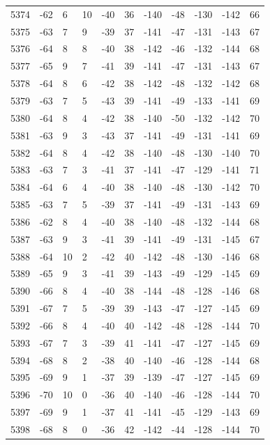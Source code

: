 \begin{table}[H]
\begin{tabular}{lllllllllll}
5374 & -62 & 6 & 10 & -40 & 36 & -140 & -48 & -130 & -142 & 66 \\
5375 & -63 & 7 & 9 & -39 & 37 & -141 & -47 & -131 & -143 & 67 \\
5376 & -64 & 8 & 8 & -40 & 38 & -142 & -46 & -132 & -144 & 68 \\
5377 & -65 & 9 & 7 & -41 & 39 & -141 & -47 & -131 & -143 & 67 \\
5378 & -64 & 8 & 6 & -42 & 38 & -142 & -48 & -132 & -142 & 68 \\
5379 & -63 & 7 & 5 & -43 & 39 & -141 & -49 & -133 & -141 & 69 \\
5380 & -64 & 8 & 4 & -42 & 38 & -140 & -50 & -132 & -142 & 70 \\
5381 & -63 & 9 & 3 & -43 & 37 & -141 & -49 & -131 & -141 & 69 \\
5382 & -64 & 8 & 4 & -42 & 38 & -140 & -48 & -130 & -140 & 70 \\
5383 & -63 & 7 & 3 & -41 & 37 & -141 & -47 & -129 & -141 & 71 \\
5384 & -64 & 6 & 4 & -40 & 38 & -140 & -48 & -130 & -142 & 70 \\
5385 & -63 & 7 & 5 & -39 & 37 & -141 & -49 & -131 & -143 & 69 \\
5386 & -62 & 8 & 4 & -40 & 38 & -140 & -48 & -132 & -144 & 68 \\
5387 & -63 & 9 & 3 & -41 & 39 & -141 & -49 & -131 & -145 & 67 \\
5388 & -64 & 10 & 2 & -42 & 40 & -142 & -48 & -130 & -146 & 68 \\
5389 & -65 & 9 & 3 & -41 & 39 & -143 & -49 & -129 & -145 & 69 \\
5390 & -66 & 8 & 4 & -40 & 38 & -144 & -48 & -128 & -146 & 68 \\
5391 & -67 & 7 & 5 & -39 & 39 & -143 & -47 & -127 & -145 & 69 \\
5392 & -66 & 8 & 4 & -40 & 40 & -142 & -48 & -128 & -144 & 70 \\
5393 & -67 & 7 & 3 & -39 & 41 & -141 & -47 & -127 & -145 & 69 \\
5394 & -68 & 8 & 2 & -38 & 40 & -140 & -46 & -128 & -144 & 68 \\
5395 & -69 & 9 & 1 & -37 & 39 & -139 & -47 & -127 & -145 & 69 \\
5396 & -70 & 10 & 0 & -36 & 40 & -140 & -46 & -128 & -144 & 70 \\
5397 & -69 & 9 & 1 & -37 & 41 & -141 & -45 & -129 & -143 & 69 \\
5398 & -68 & 8 & 0 & -36 & 42 & -142 & -44 & -128 & -144 & 70 \\

\end{tabular}
\end{table}
